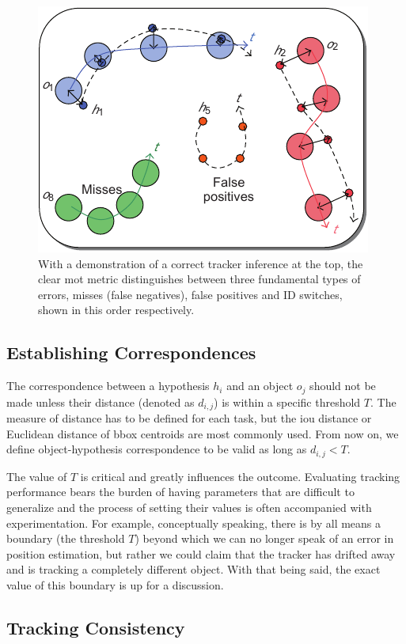 \begin{figure}[t]
    \centerline{\includegraphics[width=0.6\linewidth]{figures/theoretical_foundations/clear_hypotheses_status.pdf}}
    \caption[\gls{clear} hypotheses status]{With a demonstration of a correct tracker inference at the top, the \gls{clear} \gls{mot} metric distinguishes between three fundamental types of errors, misses (false negatives), false positives and ID switches, shown in this order respectively. }
    \label{fig:CLEARHypotheses}
\end{figure}

\subsection{Establishing Correspondences}

The correspondence between a hypothesis $h_i$ and an object $o_j$ should not be made unless their distance (denoted as $d_{i,j}$) is within a specific threshold $T$. The measure of distance has to be defined for each task, but the \gls{iou} distance or Euclidean distance of \gls{bbox} centroids are most commonly used. From now on, we define object-hypothesis correspondence to be valid as long as $d_{i,j} < T$.

The value of $T$ is critical and greatly influences the outcome. Evaluating tracking performance bears the burden of having parameters that are difficult to generalize and the process of setting their values is often accompanied with experimentation. For example, conceptually speaking, there is by all means a boundary (the threshold $T$) beyond which we can no longer speak of an error in position estimation, but rather we could claim that the tracker has drifted away and is tracking a completely different object. With that being said, the exact value of this boundary is up for a discussion. 

\subsection{Tracking Consistency}


